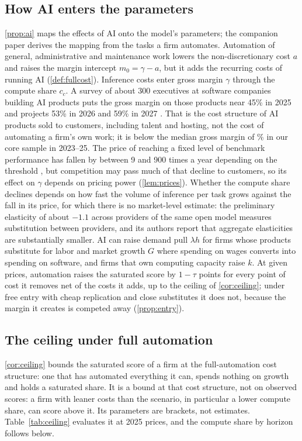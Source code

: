 \subsection{How AI enters the parameters}
\autoref{prop:ai} maps the effects of AI onto the model's parameters; the companion paper \citep{murthy2026transformation} derives the mapping from the tasks a firm automates. Automation of general, administrative and maintenance work lowers the non-discretionary cost $a$ and raises the margin intercept $m_0=\gamma-a$, but it adds the recurring costs of running AI (\autoref{def:fullcost}). Inference costs enter gross margin $\gamma$ through the compute share $c_c$. A survey of about 300 executives at software companies building AI products puts the gross margin on those products near 45\% in 2025 and projects 53\% in 2026 and 59\% in 2027 \citep{iconiq2026state}. That is the cost structure of AI products sold to customers, including talent and hosting, not the cost of automating a firm's own work; it is below the median gross margin of \MedGrossMargin\% in our core sample in 2023--25. The price of reaching a fixed level of benchmark performance has fallen by between 9 and 900 times a year depending on the threshold \citep{epoch2025inference}, but competition may pass much of that decline to customers, so its effect on $\gamma$ depends on pricing power (\autoref{lem:prices}). Whether the compute share declines depends on how fast the volume of inference per task grows against the fall in its price, for which there is no market-level estimate: the preliminary elasticity of about $-1.1$ across providers of the same open model \citep{demirer2025emerging} measures substitution between providers, and its authors report that aggregate elasticities are substantially smaller. AI can raise demand pull $\lambda h$ for firms whose products substitute for labor and market growth $G$ where spending on wages converts into spending on software, and firms that own computing capacity raise $k$. At given prices, automation raises the saturated score by $1-\tau$ points for every point of cost it removes net of the costs it adds, up to the ceiling of \autoref{cor:ceiling}; under free entry with cheap replication and close substitutes it does not, because the margin it creates is competed away (\autoref{prop:entry}).

\subsection{The ceiling under full automation}\label{sec:horizons-ceiling}
\autoref{cor:ceiling} bounds the saturated score of a firm at the full-automation cost structure: one that has automated everything it can, spends nothing on growth and holds a saturated share. It is a bound at that cost structure, not on observed scores: a firm with leaner costs than the scenario, in particular a lower compute share, can score above it. Its parameters are brackets, not estimates. Table~\ref{tab:ceiling} evaluates it at 2025 prices, and the compute share by horizon follows below.

